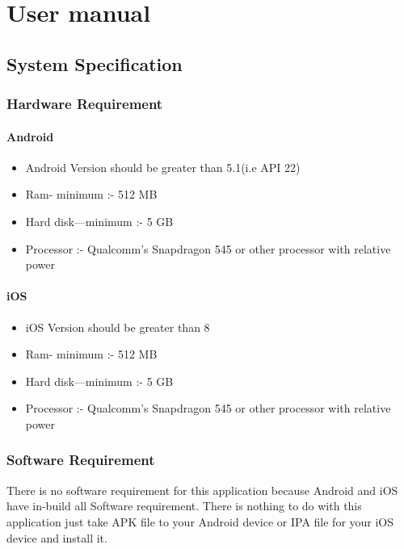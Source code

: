 \chapter{User manual}\label{appendix2}



\section{System Specification}

\subsection{Hardware Requirement}

\subsubsection{Android}
\begin{itemize}
\item Android Version should be greater than 5.1(i.e API 22)
\item Ram- minimum :- 512 MB
\item Hard disk—minimum :- 5 GB
\item Processor :- Qualcomm’s Snapdragon 545 or other processor with relative power
\end{itemize}

\subsubsection{iOS}
\begin{itemize}
\item iOS Version should be greater than 8
\item Ram- minimum :- 512 MB
\item Hard disk—minimum :- 5 GB
\item Processor :- Qualcomm’s Snapdragon 545 or other processor with relative power
\end{itemize}


\subsection{Software Requirement}

There is no software requirement for this application because Android and iOS have in-build all Software requirement. There is nothing to do with this application just take APK file to your Android device or IPA file for your iOS device and install it.


